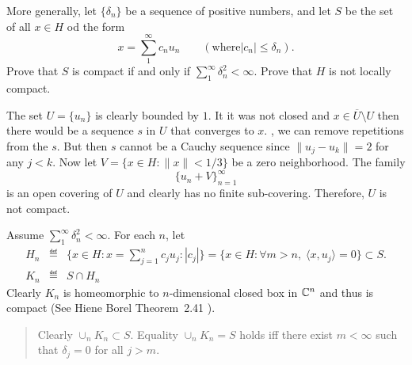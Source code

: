 \begin{enumerate}
\begin{excopy}
More generally, let \(\{\delta_n\}\) be a sequence of positive numbers,
and let $S$ be the set of all \(x\in H\) od the form
\begin{equation*}
x = \sum_1^\infty c_n u_n
  \qquad \left(\textrm{where} |c_n| \leq \delta_n\right).
\end{equation*}
Prove that $S$ is compact if and only if \(\sum_1^\infty \delta_n^2 < \infty\).
Prove that $H$ is not locally compact.
\end{excopy}

The set \(U = \{u_n\}\) is clearly bounded by $1$.
It it was not closed and \(x\in\overline{U}\setminus U\) then
there would be a sequence $s$ in $U$ that converges to $x$.
\Wlogy, we can remove repetitions from the $s$.
But then $s$ cannot be a Cauchy sequence since \(\|u_j - u_k\|=2\)
for any \(j<k\).
Now let \(V = \{x\in H: \|x\| < 1/3\}\) be a zero neighborhood.
The family
\begin{equation*}
\{u_n + V\}_{n=1}^\infty
\end{equation*}
is an open covering of $U$ and clearly has no finite sub-covering.
Therefore, $U$ is not compact.

Assume \(\sum_1^\infty \delta_n^2 < \infty\).
For each $n$, let
\begin{eqnarray*}
H_n &\eqdef& \{x\in H: x = \sum_{j=1}^n c_j u_j: |c_j|\}
             = \{x\in H: \forall m > n,\; \langle x,u_j\rangle = 0\}
             \subset S. \\
K_n &\eqdef& S \cap H_n
\end{eqnarray*}
Clearly \(K_n\) is homeomorphic to $n$-dimensional closed box in \(\mathbb{C}^n\)
and thus is compact (See Hiene Borel Theorem~2.41 \cite{RudinPMA85}).
\begin{quotation}
\small
Clearly \(\cup_n K_n \subset S\).
Equality \(\cup_n K_n = S\) holds iff there exist \(m<\infty\)
such that \(\delta_j = 0\) for all \(j>m\).
\end{quotation}


\end{enumerate}
